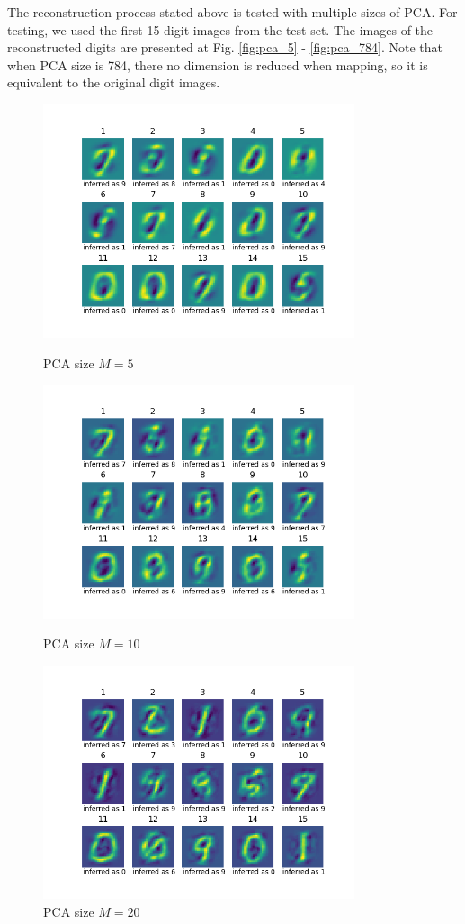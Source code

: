 \documentclass[conference]{IEEEtran}
\begin{document}
The reconstruction process stated above is tested with multiple sizes of PCA. 
For testing, we used the first 15 digit images from the test set.
The images of the reconstructed digits are presented at Fig. \ref{fig:pca_5} - \ref{fig:pca_784}. Note that when PCA size is 784, there no dimension is reduced when mapping, so it is equivalent to the original digit images.

\begin{figure}[!t]
	\centering
	\includegraphics[width=3.6in]{reconst-PCA-5.png}	
	\caption{PCA size $M=5$}
	\label{fig:pca_5}
	\includegraphics[width=3.6in]{reconst-PCA-10.png}
	\caption{PCA size $M=10$}
	\label{fig:pca_10}
	\includegraphics[width=3.6in]{reconst-PCA-20.png}
	\caption{PCA size $M=20$}
	\label{fig:pca_20}
\end{figure}
\end{document}
